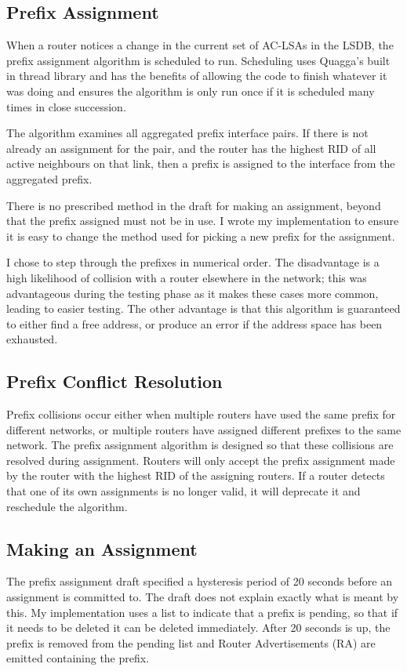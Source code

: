 \subsection{Prefix Assignment}
When a router notices a change in the current set of AC-LSAs in the LSDB, the
prefix assignment algorithm is scheduled to run. Scheduling uses Quagga's built
in thread library and has the benefits of allowing the code to finish whatever
it was doing and ensures the algorithm is only run once if it is scheduled many
times in close succession.

The algorithm examines all aggregated prefix interface pairs. If there is not
already an assignment for the pair, and the router has the highest RID of all
active neighbours on that link, then a prefix is assigned to the interface from
the aggregated prefix. 

There is no prescribed method in the draft for making an assignment, beyond
that the prefix assigned must not be in use. I wrote my implementation to
ensure it is easy to change the method used for picking a new prefix for the
assignment. 

I chose to step through the prefixes in numerical order. The disadvantage is a
high likelihood of collision with a router elsewhere in the network; this was
advantageous during the testing phase as it makes these cases more common,
leading to easier testing. The other advantage is that this algorithm is
guaranteed to either find a free address, or produce an error if the address
space has been exhausted. 

\subsection{Prefix Conflict Resolution}
Prefix collisions occur either when multiple routers have used the same prefix for
different networks, or multiple routers have assigned different prefixes to the
same network. The prefix assignment algorithm is designed so that these
collisions are resolved during assignment. Routers will only accept the prefix
assignment made by the router with the highest RID of the assigning routers. If
a router detects that one of its own assignments is no longer valid, it will
deprecate it and reschedule the algorithm. 

\subsection{Making an Assignment}
\label{pending_list}
The prefix assignment draft specified a hysteresis period of 20 seconds
before an assignment is committed to. The draft does not explain exactly what
is meant by this. My implementation uses a list to indicate that a prefix is
pending, so that if it needs to be deleted it can be deleted immediately. After
20 seconds is up, the prefix is removed from the pending list and Router
Advertisements (RA) are emitted containing the prefix.
 

